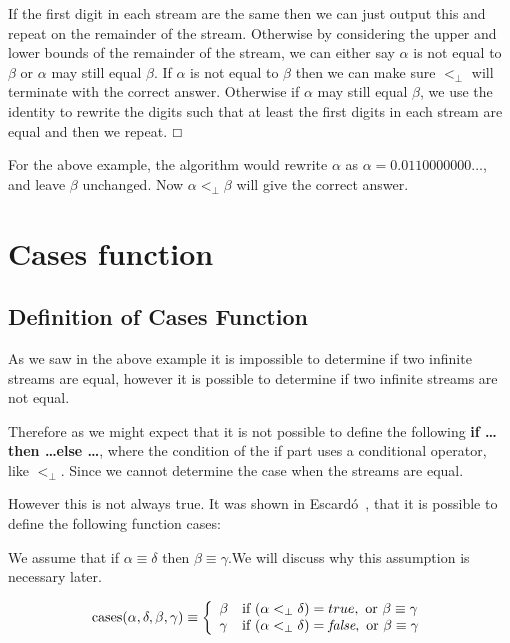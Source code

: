\documentclass{cs4rep}
\begin{document}
If the first digit in each stream are the same then we can just output
this and repeat on the remainder of the stream. Otherwise by
considering the upper and lower bounds of the remainder of the stream,
we can either say $\alpha$ is not equal to $\beta$ or $\alpha$ may
still equal $\beta$. If $\alpha$ is not equal to $\beta$ then we can
make sure $<_{\perp}$ will terminate with the correct answer.
Otherwise if $\alpha$ may still equal $\beta$, we use the identity to
rewrite the digits such that at least the first digits in each stream
are equal and then we repeat.  \hfill $\boxempty$


For the above example, the algorithm would rewrite $\alpha$ as $\alpha = 0.0110000000 \ldots$, and leave $\beta$ unchanged. Now $\alpha <_{\perp} \beta$ will give the correct answer. 


\section{Cases function} \label{sec:cases}

\subsection*{Definition of Cases Function}
As we saw in the above example it is impossible to determine if two
infinite streams are equal, however it is possible to determine if two
infinite streams are not equal.

Therefore as we might expect that it is not possible to define the
following {\bf if \ldots then \ldots else \ldots}, where the condition
of the if part uses a conditional operator, like $<_{\perp}$. Since we
cannot determine the case when the streams are equal.

However this is not always true. It was shown in
Escard\'o~\cite{kn:Escardo}, that it is possible to define the
following function cases:

We assume that if $\alpha \equiv \delta$ then $\beta \equiv \gamma$.We will
discuss why this assumption is necessary later.

\[ \mbox{cases}(\alpha,\delta,\beta,\gamma) \equiv \left\{ 
\begin{array}{ll}
\beta & \mbox{if } (\alpha <_{\perp} \delta) = true, \mbox{ or } \beta \equiv \gamma \\
\gamma & \mbox{if } (\alpha <_{\perp} \delta) =  \mbox{{\em false}}, \mbox{ or } \beta \equiv \gamma
\end{array}
\right. \]
\end{document}
